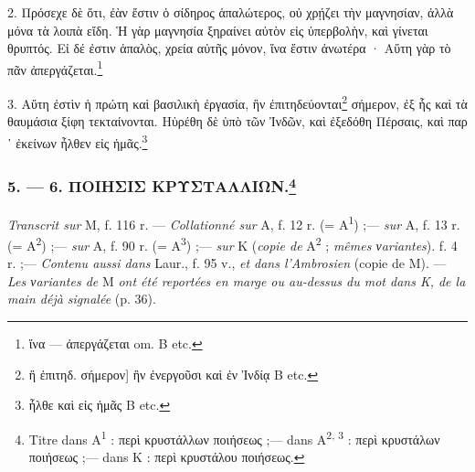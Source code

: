 \documentclass[a4paper, 11pt, oneside, polutonikogreek, french]{article}
\begin{document}
2. Πρόσεχε δὲ ὅτι, ἐὰν ἔστιν ὁ σίδηρος ἁπαλώτερος, οὐ χρῄζει τὴν μαγνησίαν, ἀλλὰ μόνα τὰ λοιπὰ εἴδη. Ἡ γὰρ μαγνησία ξηραίνει αὐτὸν εἰς ὑπερβολὴν, καὶ γίνεται θρυπτός. Εἰ δέ ἐστιν ἁπαλὸς, χρεία αὐτῆς μόνον, ἵνα ἔστιν ἀνωτέρα · Αὕτη γὰρ τὸ πᾶν ἀπεργάζεται.\footnote{ἵνα --- ἀπεργάζεται om. B etc.}

3. Αὕτη ἐστὶν ἡ πρώτη καὶ βασιλικὴ ἐργασία, ἣν ἐπιτηδεύονται\footnote{ἣ ἐπιτηδ. σήμερον] ἣν ἐνεργοῦσι καὶ ἐν Ἰνδίᾳ B etc.} σήμερον, ἐξ ἧς καὶ τὰ θαυμάσια ξίφη τεκταίνονται. Ηὑρέθη δὲ ὑπὸ τῶν Ἰνδῶν, καὶ ἐξεδόθη Πέρσαις, καὶ παρ ᾽ ἐκείνων ἦλθεν εἰς ἡμᾶς.\footnote{ἦλθε καὶ εἰς ἡμᾶς B etc.}

\bigskip
\centerline{\EightStarTaper}
\centerline{\EightStarTaper\EightStarTaper}
\bigskip

\subsubsection[5. --- 6. ΠΟΙΗΣΙΣ ΚΡΥΣΤΑΛΛΙΩΝ.]{5. --- 6. ΠΟΙΗΣΙΣ ΚΡΥΣΤΑΛΛΙΩΝ.\footnote{Titre dans A\textsuperscript{1} : περὶ κρυστάλλων ποιήσεως ;--- dans A\textsuperscript{2, 3} : περὶ κρυστάλων ποιήσεως ;--- dans K : περὶ κρυστάλου ποιήσεως.}}

\emph{Transcrit sur} M, f. 116 r. --- \emph{Collationné sur} A, f. 12 r. (= A\textsuperscript{1}) ;--- \emph{sur} A, f. 13 r. (= A\textsuperscript{2}) ;--- \emph{sur} A, f. 90 r. (= A\textsuperscript{3}) ;--- \emph{sur} K (\emph{copie de} A\textsuperscript{2} ; \emph{mêmes νariantes}). f. 4 r. ;--- \emph{Contenu aussi dans} Laur., f. 95 v., \emph{et dans l'Ambrosien} (copie de M). --- \emph{Les νariantes de} M \emph{ont été reportées en marge ou au-dessus du mot dans K, de la main déjà signalée} (p. 36).

\bigskip
\end{document}
